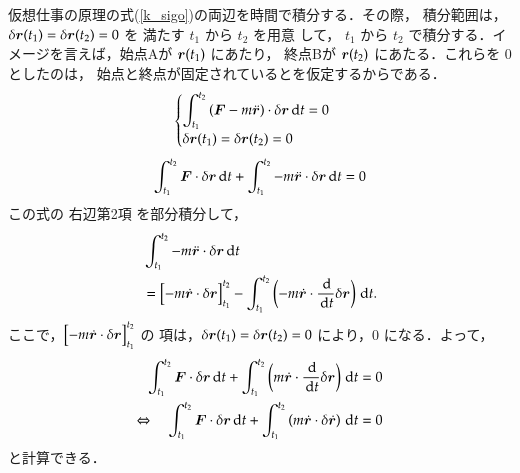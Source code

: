             仮想仕事の原理の式(\ref{k_sigo})の両辺を時間で積分する．その際，
            積分範囲は，$\delta \boldsymbol{r}(t_{1})=\delta\boldsymbol{r}(t_{2})=0$ を
            満たす $t_{1}$ から $t_{2}$ を用意
            して， $t_{1}$ から $t_{2}$ で積分する．イメージを言えば，始点Aが $\boldsymbol{r}(t_{1})$ にあたり，
            終点Bが $\boldsymbol{r}(t_{2})$ にあたる．これらを 0 としたのは，
            始点と終点が固定されているとを仮定するからである．
                \begin{align}
                    \begin{cases}
                        \displaystyle \int_{t_{1}}^{t_{2}}\left(\boldsymbol{F}
                        -m\ddot{\boldsymbol{r}}\right)\cdot\delta\boldsymbol{r} \,\mathrm{d} t = 0 \\
                        \displaystyle \delta\boldsymbol{r}(t_{1})=\displaystyle \delta \boldsymbol{r}(t_{2})= 0
                    \end{cases}
                \end{align}
                \begin{align}
                        \displaystyle \int_{t_{1}}^{t_{2}}\boldsymbol{F}\cdot\delta\boldsymbol{r}\,\mathrm{d} t+
                        \int_{t_{1}}^{t_{2}}-m\ddot{\boldsymbol{r}}\cdot\delta\boldsymbol{r} \,\mathrm{d} t = 0
                \end{align}
            この式の 右辺第2項 を部分積分して，
                \begin{align}
                        \mbox{}
                        &  \int_{t_{1}}^{t_{2}}-m\ddot{\boldsymbol{r}}\cdot\delta\boldsymbol{r} \,\mathrm{d} t \notag \\
                        &= \Bigl[ -m\dot{\boldsymbol{r}}\cdot\delta\boldsymbol{r} \Bigr]_{t_{1}}^{t_{2}}
                           -\int_{t_{1}}^{t_{2}} \left(-m\dot{\boldsymbol{r}}\cdot \frac{\,\mathrm{d} }{\,\mathrm{d} t} \delta\boldsymbol{r} \right) \,\mathrm{d} t.
                \end{align}
            ここで，$\Bigl[ -m\dot{\boldsymbol{r}}\cdot\delta\boldsymbol{r} \Bigr]_{t_{1}}^{t_{2}}$ の
            項は，$\delta \boldsymbol{r}(t_{1})=\delta\boldsymbol{r}(t_{2})=0$ により，0 になる．よって，
                \begin{align}
                        \int_{t_{1}}^{t_{2}}\boldsymbol{F}\cdot\delta\boldsymbol{r}\,\mathrm{d} t+
                        \int_{t_{1}}^{t_{2}}
                        \left(m\dot{\boldsymbol{r}}\cdot \frac{\,\mathrm{d} }{\,\mathrm{d} t} \delta\boldsymbol{r} \right) \,\mathrm{d} t &= 0 \notag \\
                        \Leftrightarrow \quad
                        \int_{t_{1}}^{t_{2}}\boldsymbol{F}\cdot\delta\boldsymbol{r}\,\mathrm{d} t+
                        \int_{t_{1}}^{t_{2}}
                        \left(m\dot{\boldsymbol{r}}\cdot\delta \dot{\boldsymbol{r}} \right) \,\mathrm{d} t &= 0
                \end{align}
            と計算できる．


